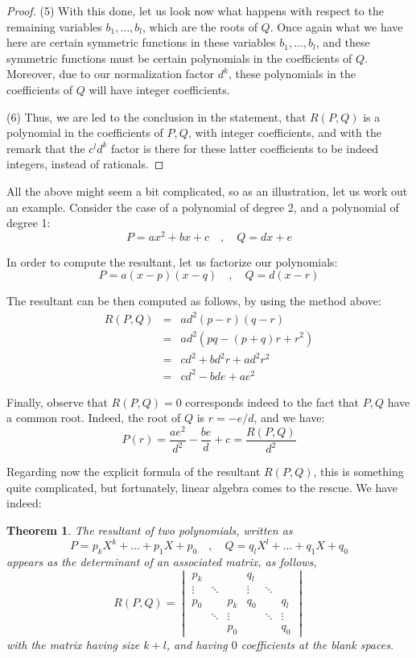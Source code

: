 \documentclass[12pt]{amsbook}
\newtheorem{theorem}{Theorem}[chapter]
\begin{document}
\begin{proof}
\medskip

(5) With this done, let us look now what happens with respect to the remaining variables $b_1,\ldots,b_l$, which are the roots of $Q$. Once again what we have here are certain symmetric functions in these variables $b_1,\ldots,b_l$, and these symmetric functions must be certain polynomials in the coefficients of $Q$. Moreover, due to our normalization factor $d^k$, these polynomials in the coefficients of $Q$ will have integer coefficients.

\medskip

(6) Thus, we are led to the conclusion in the statement, that $R(P,Q)$ is a polynomial in the coefficients of $P,Q$, with integer coefficients, and with the remark that the $c^ld^k$ factor is there for these latter coefficients to be indeed integers, instead of rationals.
\end{proof}

All the above might seem a bit complicated, so as an illustration, let us work out an example. Consider the case of a polynomial of degree 2, and a polynomial of degree 1:
$$P=ax^2+bx+c\quad,\quad 
Q=dx+e$$

In order to compute the resultant, let us factorize our polynomials:
$$P=a(x-p)(x-q)\quad,\quad 
Q=d(x-r)$$

The resultant can be then computed as follows, by using the method above:
\begin{eqnarray*}
R(P,Q)
&=&ad^2(p-r)(q-r)\\
&=&ad^2(pq-(p+q)r+r^2)\\
&=&cd^2+bd^2r+ad^2r^2\\
&=&cd^2-bde+ae^2
\end{eqnarray*}

Finally, observe that $R(P,Q)=0$ corresponds indeed to the fact that $P,Q$ have a common root. Indeed, the root of $Q$ is $r=-e/d$, and we have:
$$P(r)
=\frac{ae^2}{d^2}-\frac{be}{d}+c
=\frac{R(P,Q)}{d^2}$$

Regarding now the explicit formula of the resultant $R(P,Q)$, this is something quite complicated, but fortunately, linear algebra comes to the rescue. We have indeed:


\begin{theorem}
The resultant of two polynomials, written as 
$$P=p_kX^k+\ldots+p_1X+p_0\quad,\quad 
Q=q_lX^l+\ldots+q_1X+q_0$$
appears as the determinant of an associated matrix, as follows,
$$R(P,Q)=
\begin{vmatrix}
p_k&&&q_l\\
\vdots&\ddots&&\vdots&\ddots\\
p_0&&p_k&q_0&&q_l\\
&\ddots&\vdots&&\ddots&\vdots\\
&&p_0&&&q_0
\end{vmatrix}
$$
with the matrix having size $k+l$, and having $0$ coefficients at the blank spaces.
\end{theorem}
\end{document}
